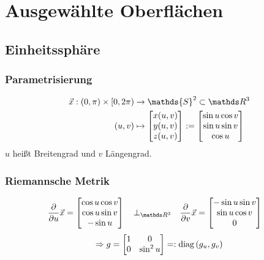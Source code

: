 \section{Ausgewählte Oberflächen}

  \subsection{Einheitssphäre}
    \label{sphere}

    \subsubsection{Parametrisierung}
      \begin{align}
      \begin{aligned}
        \vec{x}: \left( 0, \pi \right) \times \left[ 0 , 2\pi \right)
                    &\rightarrow \mathds{S}^{2} \subset \R^{3} \\
             \left( u,v \right) 
                    &\mapsto\begin{bmatrix}
                              x(u,v) \\ y(u,v) \\ z(u,v)
                            \end{bmatrix}
                    := \begin{bmatrix}
                        \sin u \cos v \\
                        \sin u \sin v \\
                        \cos u
                      \end{bmatrix}
      \end{aligned}
      \end{align}
      \( u \) heißt Breitengrad und \( v \) Längengrad.

    \subsubsection{Riemannsche Metrik}
      \begin{align}
        \frac{\partial}{\partial u}\vec{x}
              &=\begin{bmatrix}
                  \cos u \cos v \\
                  \cos u \sin v \\
                  -\sin u
                \end{bmatrix}
              \quad\bot_{\R^{3}}\quad
              \frac{\partial}{\partial v}\vec{x}
              =\begin{bmatrix}
                        -\sin u \sin v \\
                        \sin u \cos v \\
                        0
                \end{bmatrix}
      \end{align}
      \begin{align}
        \Rightarrow g = \begin{bmatrix}
              1 & 0 \\ 0 & \sin^{2} u
            \end{bmatrix}
          =: \text{diag}\left( g_{u}, g_{v} \right)
      \end{align}

